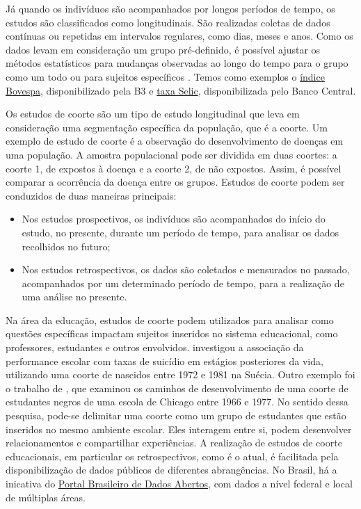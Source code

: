 Já quando os indivíduos são acompanhados por longos períodos de tempo, os estudos são classificados como longitudinais. São realizadas coletas de dados contínuas ou repetidas em intervalos regulares, como dias, meses e anos. Como os dados levam em consideração um grupo pré-definido, é possível ajustar os métodos estatísticos para mudanças observadas ao longo do tempo para o grupo como um todo ou para sujeitos específicos \autocite{Caruana2015}. Temos como exemplos o \href{https://www.b3.com.br/pt_br/market-data-e-indices/indices/indices-amplos/ibovespa.htm}{índice Bovespa}, disponibilizado pela B3 e \href{https://www.bcb.gov.br/controleinflacao/taxaselic}{taxa Selic}, disponibilizada pelo Banco Central.

Os estudos de coorte são um tipo de estudo longitudinal que leva em consideração uma segmentação específica da população, que é a coorte. Um exemplo de estudo de coorte é a observação do desenvolvimento de doenças em uma população. A amostra populacional pode ser dividida em duas coortes: a coorte 1, de expostos à doença e a coorte 2, de não expostos. Assim, é possível comparar a ocorrência da doença entre os grupos. Estudos de coorte podem ser conduzidos de duas maneiras principais: 

\begin{itemize}
  \item Nos estudos prospectivos, os indivíduos são acompanhados do início do estudo, no presente, durante um período de tempo, para analisar os dados recolhidos no futuro;
  \item Nos estudos retrospectivos, os dados são coletados e mensurados no passado, acompanhados por um determinado período de tempo, para a realização de uma análise no presente.
\end{itemize}

Na área da educação, estudos de coorte podem utilizados para analisar como questões específicas impactam sujeitos inseridos no sistema educacional, como professores, estudantes e outros envolvidos. \citet{Bjorkenstam993} investigou a associação da performance escolar com taxas de suicídio em estágios posteriores da vida, utilizando uma coorte de nascidos entre 1972 e 1981 na Suécia. Outro exemplo foi o trabalho de \citet{Ensminger1992}, que examinou os caminhos de desenvolvimento de uma coorte de estudantes negros de uma escola de Chicago entre 1966 e 1977. No sentido dessa pesquisa, pode-se delimitar uma coorte como um grupo de estudantes que estão inseridos no mesmo ambiente escolar. Eles interagem entre si, podem desenvolver relacionamentos e compartilhar experiências. A realização de estudos de coorte educacionais, em particular os retrospectivos, como é o atual, é facilitada pela disponibilização de dados públicos de diferentes abrangências. No Brasil, há a inicativa do \href{https://dados.gov.br/home}{Portal Brasileiro de Dados Abertos}, com dados a nível federal e local de múltiplas áreas. 


